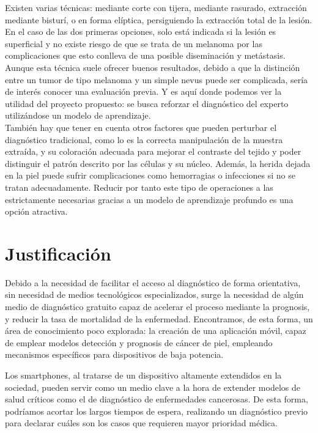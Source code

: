 Existen varias técnicas: mediante corte con tijera, mediante rasurado, extracción mediante bisturí, o en forma elíptica, persiguiendo la extracción total de la lesión. En el caso de las dos primeras opciones, solo está indicada si la lesión es superficial y no existe riesgo de que se trata de un melanoma por las complicaciones que esto conlleva de una posible diseminación y metástasis. \\

Aunque esta técnica suele ofrecer buenos resultados, debido a que la distinción entre un tumor de tipo melanoma y un simple nevus puede ser complicada, sería de interés conocer una evaluación previa. Y es aquí donde podemos ver la utilidad del proyecto propuesto: se busca reforzar el diagnóstico del experto utilizándose un modelo de aprendizaje.\\

También hay que tener en cuenta otros factores que pueden perturbar el diagnóstico tradicional, como lo es la correcta manipulación de la muestra extraída, y su coloración adecuada para mejorar el contraste del tejido y poder distinguir el patrón descrito por las células y su núcleo. Además, la herida dejada en la piel puede sufrir complicaciones como hemorragias o infecciones si no se tratan adecuadamente. Reducir por tanto este tipo de operaciones a las estrictamente necesarias gracias a un modelo de aprendizaje profundo es una opción atractiva.

\section{Justificación}

Debido a la necesidad de facilitar el acceso al diagnóstico de forma orientativa, sin necesidad  de medios tecnológicos especializados, surge la necesidad de algún medio de diagnóstico gratuito capaz de acelerar el proceso mediante la prognosis, y reducir la tasa de mortalidad de la enfermedad. Encontramos, de esta forma, un área de conocimiento poco explorada: la creación de una aplicación móvil, capaz de emplear modelos detección y prognosis de cáncer de piel, empleando mecanismos específicos para dispositivos de baja potencia.

Los smartphones, al tratarse de un dispositivo altamente extendidos en la sociedad, pueden servir como un medio clave a la hora de extender modelos de salud críticos como el de diagnóstico de enfermedades cancerosas. De esta forma, podríamos acortar los largos tiempos de espera, realizando un diagnóstico previo para declarar cuáles son los casos que requieren mayor prioridad médica.

